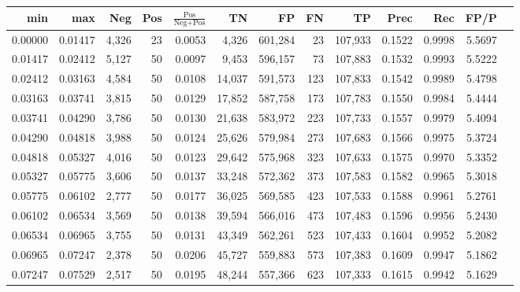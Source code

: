 \begin{tabular}{rrrrrrrrrrrrr}
\toprule
    min &     max &   Neg & Pos & $\frac{\text{Pos}}{\text{Neg}+\text{Pos}}$ &      TN &      FP &      FN &      TP &   Prec &    Rec &   FP/P \\
\midrule
0.00000 & 0.01417 & 4,326 &  23 &                                     0.0053 &   4,326 & 601,284 &      23 & 107,933 & 0.1522 & 0.9998 & 5.5697 \\
0.01417 & 0.02412 & 5,127 &  50 &                                     0.0097 &   9,453 & 596,157 &      73 & 107,883 & 0.1532 & 0.9993 & 5.5222 \\
0.02412 & 0.03163 & 4,584 &  50 &                                     0.0108 &  14,037 & 591,573 &     123 & 107,833 & 0.1542 & 0.9989 & 5.4798 \\
0.03163 & 0.03741 & 3,815 &  50 &                                     0.0129 &  17,852 & 587,758 &     173 & 107,783 & 0.1550 & 0.9984 & 5.4444 \\
0.03741 & 0.04290 & 3,786 &  50 &                                     0.0130 &  21,638 & 583,972 &     223 & 107,733 & 0.1557 & 0.9979 & 5.4094 \\
0.04290 & 0.04818 & 3,988 &  50 &                                     0.0124 &  25,626 & 579,984 &     273 & 107,683 & 0.1566 & 0.9975 & 5.3724 \\
0.04818 & 0.05327 & 4,016 &  50 &                                     0.0123 &  29,642 & 575,968 &     323 & 107,633 & 0.1575 & 0.9970 & 5.3352 \\
0.05327 & 0.05775 & 3,606 &  50 &                                     0.0137 &  33,248 & 572,362 &     373 & 107,583 & 0.1582 & 0.9965 & 5.3018 \\
0.05775 & 0.06102 & 2,777 &  50 &                                     0.0177 &  36,025 & 569,585 &     423 & 107,533 & 0.1588 & 0.9961 & 5.2761 \\
0.06102 & 0.06534 & 3,569 &  50 &                                     0.0138 &  39,594 & 566,016 &     473 & 107,483 & 0.1596 & 0.9956 & 5.2430 \\
0.06534 & 0.06965 & 3,755 &  50 &                                     0.0131 &  43,349 & 562,261 &     523 & 107,433 & 0.1604 & 0.9952 & 5.2082 \\
0.06965 & 0.07247 & 2,378 &  50 &                                     0.0206 &  45,727 & 559,883 &     573 & 107,383 & 0.1609 & 0.9947 & 5.1862 \\
0.07247 & 0.07529 & 2,517 &  50 &                                     0.0195 &  48,244 & 557,366 &     623 & 107,333 & 0.1615 & 0.9942 & 5.1629 \\

\end{tabular}
